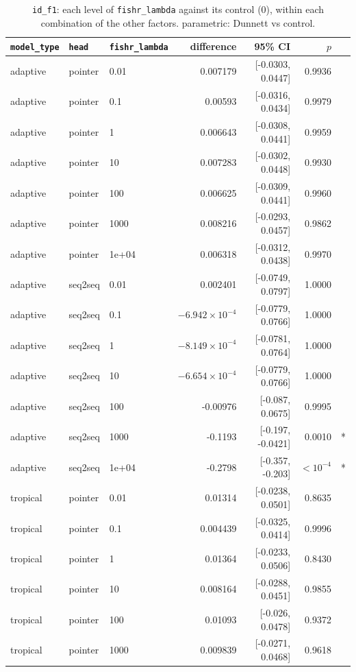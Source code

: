 \documentclass[10pt]{article}
\begin{document}
{\small
\begin{longtable}{lllrrrl}
\caption{\texttt{id\_f1}: each level of \texttt{fishr\_lambda} against its control (0), within each combination of the other factors. parametric: Dunnett vs control.}\label{tab:control-id_f1}\\
\toprule
\texttt{model\_type} & \texttt{head} & \texttt{fishr\_lambda} & difference & 95\% CI & $p$ & \\
\midrule
\endhead
adaptive & pointer & 0.01 & 0.007179 & [-0.0303, 0.0447] & 0.9936 & \\
adaptive & pointer & 0.1 & 0.00593 & [-0.0316, 0.0434] & 0.9979 & \\
adaptive & pointer & 1 & 0.006643 & [-0.0308, 0.0441] & 0.9959 & \\
adaptive & pointer & 10 & 0.007283 & [-0.0302, 0.0448] & 0.9930 & \\
adaptive & pointer & 100 & 0.006625 & [-0.0309, 0.0441] & 0.9960 & \\
adaptive & pointer & 1000 & 0.008216 & [-0.0293, 0.0457] & 0.9862 & \\
adaptive & pointer & 1e+04 & 0.006318 & [-0.0312, 0.0438] & 0.9970 & \\
adaptive & seq2seq & 0.01 & 0.002401 & [-0.0749, 0.0797] & 1.0000 & \\
adaptive & seq2seq & 0.1 & $-6.942\times10^{-4}$ & [-0.0779, 0.0766] & 1.0000 & \\
adaptive & seq2seq & 1 & $-8.149\times10^{-4}$ & [-0.0781, 0.0764] & 1.0000 & \\
adaptive & seq2seq & 10 & $-6.654\times10^{-4}$ & [-0.0779, 0.0766] & 1.0000 & \\
adaptive & seq2seq & 100 & -0.00976 & [-0.087, 0.0675] & 0.9995 & \\
adaptive & seq2seq & 1000 & -0.1193 & [-0.197, -0.0421] & 0.0010 & *\\
adaptive & seq2seq & 1e+04 & -0.2798 & [-0.357, -0.203] & $<10^{-4}$ & *\\
tropical & pointer & 0.01 & 0.01314 & [-0.0238, 0.0501] & 0.8635 & \\
tropical & pointer & 0.1 & 0.004439 & [-0.0325, 0.0414] & 0.9996 & \\
tropical & pointer & 1 & 0.01364 & [-0.0233, 0.0506] & 0.8430 & \\
tropical & pointer & 10 & 0.008164 & [-0.0288, 0.0451] & 0.9855 & \\
tropical & pointer & 100 & 0.01093 & [-0.026, 0.0478] & 0.9372 & \\
tropical & pointer & 1000 & 0.009839 & [-0.0271, 0.0468] & 0.9618 & \\

\end{longtable}}
\end{document}
